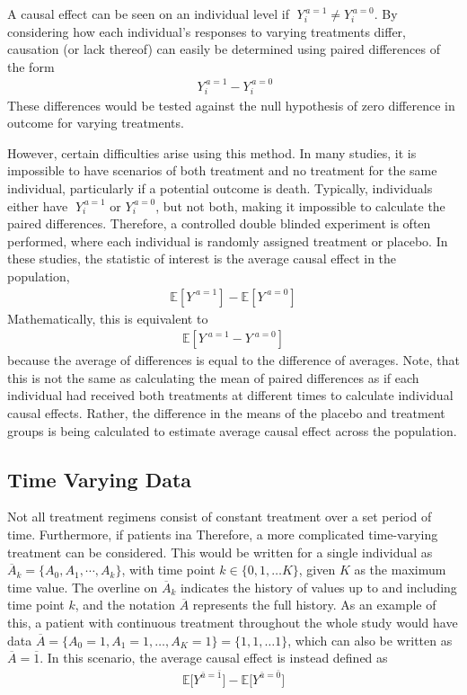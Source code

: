 A causal effect can be seen on an individual level if $\; Y_i^{\, a=1} \neq Y_i^{\, a=0}$.  By considering how each individual's responses to varying treatments differ, causation (or lack thereof) can easily be determined using paired differences of the form 
\begin{align} \; Y_i^{\, a=1} - Y_i^{\, a=0}\end{align} 
These differences would be tested against the null hypothesis of zero difference in outcome for varying treatments.  

However, certain difficulties arise using this method.  In many studies, it is impossible to have scenarios of both treatment and no treatment for the same individual, particularly if a potential outcome is death.  Typically, individuals either have $\; Y_i^{\, a=1}$ or  $Y_i^{\, a=0}$, but not both, making it impossible to calculate the paired differences.  Therefore, a controlled double blinded experiment is often performed, where each individual is randomly assigned treatment or placebo.  In these studies, the statistic of interest is the average causal effect in the population, 
\begin{align}  \mathbb{E}[Y^{\; a=1}] - \mathbb{E}[Y^{\; a=0}] \end{align} 
Mathematically, this is equivalent to 
\begin{align}  \mathbb{E}[Y^{\; a=1} - Y^{\; a=0}] \end{align}  
because the average of differences is equal to the difference of averages.\cite{hernan_robins_2016} Note, that this is not the same as calculating the mean of paired differences as if each individual had received both treatments at different times to calculate individual causal effects.  Rather, the difference in the means of the placebo and treatment groups is being calculated to estimate average causal effect across the population.  

\subsection{Time Varying Data} \label{Time-varying}
Not all treatment regimens consist of constant treatment over a set period of time.  Furthermore, if patients ina Therefore, a more complicated time-varying treatment can be considered.  This would be written for a single individual as $\overline{A}_k = \{A_0, A_1, \cdots, A_k \}$, with time point $k \in \{ 0, 1, \dots K\}$, given $K$ as the maximum time value.  The overline on $\overline{A}_k$ indicates the history of values up to and including time point $k$, and the notation $\overline{A}$ represents the full history.  As an example of this, a patient with continuous treatment throughout the whole study would have data $\overline{A} = \{A_0 = 1, A_1 = 1, \dots, A_K = 1 \}  = \{1,1,\dots 1 \}$, which can also be written as $\overline{A} = \overline{1}$.  In this scenario, the average causal effect is instead defined as 
\begin{align} \mathbb{E}\bigg[Y^{\bar{a} = \bar{1}}\bigg] -  \mathbb{E}\bigg[Y^{\bar{a} = \bar{0}}\bigg] \end{align} 

